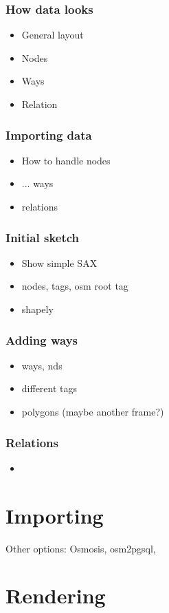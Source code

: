 \documentclass{beamer}
\begin{document}
\begin{frame}
  \frametitle{How data looks}
  \begin{itemize}
  \item General layout
  \item Nodes
  \item Ways
  \item Relation
  \end{itemize}
\end{frame}

\begin{frame}
  \frametitle{Importing data}
  \begin{itemize}
  \item How to handle nodes
  \item ... ways
  \item relations
  \end{itemize}
\end{frame}

\begin{frame}
  \frametitle{Initial sketch}
  \begin{itemize}
  \item Show simple SAX
  \item nodes, tags, osm root tag
  \item shapely
  \end{itemize}
\end{frame}

\begin{frame}
  \frametitle{Adding ways}
  \begin{itemize}
  \item ways, nds
  \item different tags
  \item polygons (maybe another frame?)
  \end{itemize}
\end{frame}


\begin{frame}
  \frametitle{Relations}
  \begin{itemize}
  \item
  \end{itemize}
\end{frame}

\section{Importing}

Other options: Osmosis, osm2pgsql,

\section{Rendering}
\end{document}
